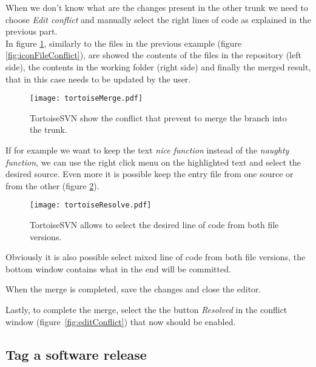 When we don't know what are the changes present in the other trunk we need to choose \textit{Edit conflict} and manually select the right lines of code as explained in the previous part.\\


In figure \ref{fig:tortoiseMerge}, similarly to the files in the previous example (figure \ref{fig:iconFileConflict}), are  showed the contents of the files in the repository (left side), the contents in the working folder (right side) and finally the merged result, that in this case needs to be updated by the user.\\

\begin{figure}[ht!]
    \centering
    \texttt{[image: tortoiseMerge.pdf]}
    \caption{TortoiseSVN show the conflict that prevent to merge the branch into the trunk.}
    \label{fig:tortoiseMerge}
\end{figure}

If for example we want to keep the text \textit{nice function} instead of the \textit{naughty function}, we can use the right click menu on the highlighted text and select the desired source. Even more it is possible keep the entry file from one source or from the other (figure \ref{fig:tortoiseResolve}).\\

\begin{figure}[ht!]
    \centering
    \texttt{[image: tortoiseResolve.pdf]}
    \caption{TortoiseSVN allows to select the desired line of code from both file versions.}
    \label{fig:tortoiseResolve}
\end{figure}

Obviously it is also possible select mixed line of code from both file versions, the bottom window contains what in the end will be committed.

When the merge is completed, save the changes and close the editor.

Lastly, to complete the merge, select the the button \textit{Resolved} in the conflict window (\hbox{figure \ref{fig:editConflict}}) that now should be enabled.

\newpage










\subsection{Tag a software release}
\label{subsection:tagSoftwareRelease}


